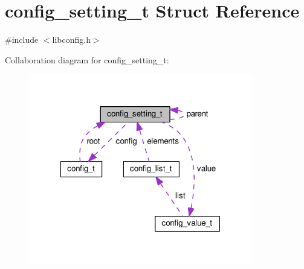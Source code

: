 \hypertarget{structconfig__setting__t}{\section{config\-\_\-setting\-\_\-t Struct Reference}
\label{structconfig__setting__t}
}


{\ttfamily \#include $<$libconfig.\-h$>$}



Collaboration diagram for config\-\_\-setting\-\_\-t\-:\nopagebreak
\begin{figure}[H]
\begin{center}
\leavevmode
\includegraphics[width=277pt]{structconfig__setting__t__coll__graph}
\end{center}
\end{figure}
